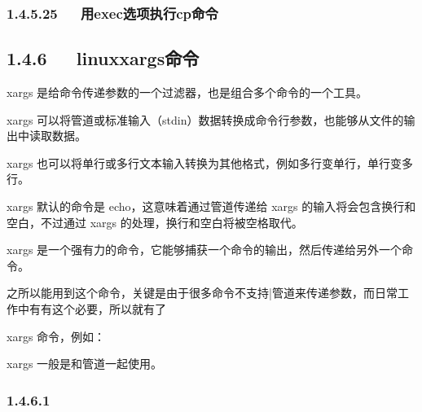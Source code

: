 \documentclass[letterpaper,12pt,english]{sphinxmanual}
\begin{document}
\subsubsection{1.4.5.25   用exec选项执行cp命令}
\label{\detokenize{001software/001install/linux:execcp}}
\begin{sphinxVerbatim}[commandchars=\\\{\}]
        \PYGZbs{}
\end{sphinxVerbatim}


\subsection{1.4.6   linux\sphinxhyphen{}xargs\sphinxhyphen{}命令}
\label{\detokenize{001software/001install/linux:linux-xargs}}
xargs
是给命令传递参数的一个过滤器，也是组合多个命令的一个工具。

xargs
可以将管道或标准输入（stdin）数据转换成命令行参数，也能够从文件的输出中读取数据。

xargs
也可以将单行或多行文本输入转换为其他格式，例如多行变单行，单行变多行。

xargs 默认的命令是 echo，这意味着通过管道传递给 xargs
的输入将会包含换行和空白，不过通过 xargs
的处理，换行和空白将被空格取代。

xargs
是一个强有力的命令，它能够捕获一个命令的输出，然后传递给另外一个命令。

之所以能用到这个命令，关键是由于很多命令不支持|管道来传递参数，而日常工作中有有这个必要，所以就有了

xargs 命令，例如：

\begin{sphinxVerbatim}[commandchars=\\\{\}]
            
         
\end{sphinxVerbatim}

xargs 一般是和管道一起使用。


\subsubsection{1.4.6.1   }
\label{\detokenize{001software/001install/linux:id21}}
\begin{sphinxVerbatim}[commandchars=\\\{\}]
    
\end{sphinxVerbatim}
\end{document}
